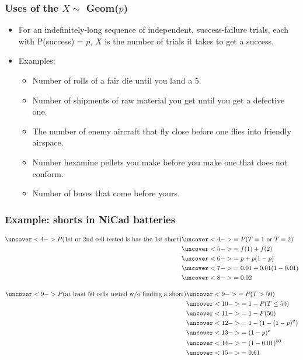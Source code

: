 \documentclass[handout]{beamer}\usepackage{graphicx, color}
\numberwithin{equation}{section}
\begin{document}
\begin{frame}
\frametitle{Uses of the $X \sim$ Geom($p$)}
\begin{itemize}
\pause \item For an indefinitely-long sequence of independent, success-failure trials, each with P(success) = $p$, $X$ is the number of trials it takes to get a success.
\pause \item Examples:
\begin{itemize}
\pause \item Number of rolls of a fair die until you land a 5.
\pause \item Number of shipments of raw material you get until you get a defective one.
\pause \item The number of enemy aircraft that fly close before one flies into friendly airspace.
\pause \item Number hexamine pellets you make before you make one that does not conform.
\pause \item Number of buses that come before yours.
\end{itemize}
\end{itemize}
\end{frame}


\begin{frame}
\frametitle{Example: shorts in NiCad batteries} \scriptsize

\begin{itemize}
\end{itemize}

\begin{align*}
\uncover<4->{ P(\text{1st or 2nd cell tested is has the 1st short})} &\uncover<4->{ = P(T = 1 \text{ or } T = 2)} \\
&\uncover<5->{  = f(1) + f(2)} \\
&\uncover<6->{  = p + p(1-p)} \\
&\uncover<7->{  = 0.01 + 0.01 (1 - 0.01)} \\
&\uncover<8->{  = 0.02}
\end{align*}

\begin{align*}
\uncover<9->{ P(\text{at least 50 cells tested w/o finding a short})} &\uncover<9->{ = P(T > 50)} \\
&\uncover<10->{  = 1 - P(T \le 50)} \\
&\uncover<11->{  = 1 - F(50) }\\
&\uncover<12->{  = 1 - (1 - (1-p)^x)} \\
&\uncover<13->{  = (1-p)^x} \\
& \uncover<14->{ = (1 - 0.01)^{50}} \\
&\uncover<15->{  = 0.61}
\end{align*}
\end{frame}
\end{document}
